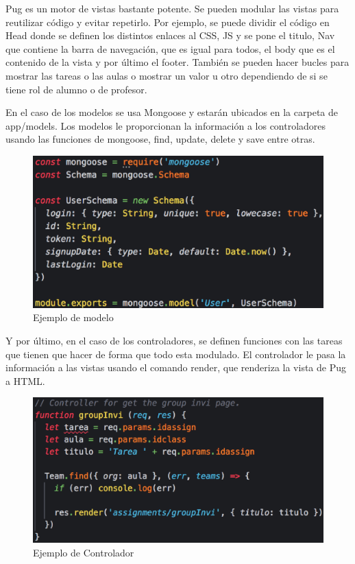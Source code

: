 Pug es un motor de vistas bastante potente. Se pueden modular las vistas para reutilizar código y evitar repetirlo.
Por ejemplo, se puede dividir el código en Head donde se definen los distintos enlaces al CSS, JS y se pone el titulo, 
Nav que contiene la barra de navegación, que es igual para todos, el body que es el contenido de la vista y por último el footer.
También se pueden hacer bucles para mostrar las tareas o las aulas o mostrar un valor u otro dependiendo de si se tiene rol de alumno o de profesor.

\newpage

En el caso de los modelos se usa Mongoose y estarán ubicados en la carpeta de app/models. Los modelos le proporcionan la información a los controladores usando las funciones de mongoose, find, update, delete y save entre otras.

\begin{figure}[!th]
\begin{center}
\includegraphics[scale=0.5]{images/modelo}
\caption{Ejemplo de modelo}
\label{fig:Ejemplo de modelo}
\end{center}
\end{figure}

Y por último, en el caso de los controladores, se definen funciones con las tareas que tienen que hacer
de forma que todo esta modulado. El controlador le pasa la información a las vistas usando el comando render, que renderiza la vista de Pug a HTML.


\begin{figure}[!th]
\begin{center}
\includegraphics[scale=0.5]{images/controlador}
\caption{Ejemplo de Controlador}
\label{fig:Ejemplo de Controlador}
\end{center}
\end{figure}


